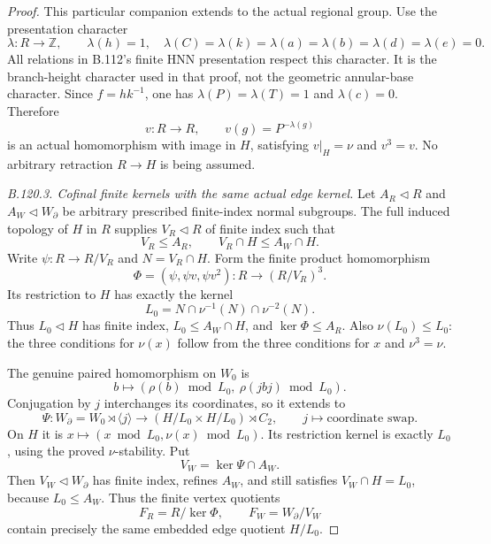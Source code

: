 \begin{proof}
This particular companion extends to the actual regional group.
Use the presentation character
\[
 \lambda:R\longrightarrow\mathbb Z,\qquad
 \lambda(h)=1,\quad
 \lambda(C)=\lambda(k)=\lambda(a)=\lambda(b)=\lambda(d)=\lambda(e)=0.
\]
All relations in B.112's finite HNN presentation respect this
character. It is the branch-height character used in that proof,
not the geometric annular-base character. Since $f=hk^{-1}$,
one has $\lambda(P)=\lambda(T)=1$ and $\lambda(c)=0$. Therefore
\begin{equation}\label{eq:B120-extension}
 v:R\longrightarrow R,\qquad v(g)=P^{-\lambda(g)}
\end{equation}
is an actual homomorphism with image in $H$, satisfying
$v|_H=\nu$ and $v^3=v$. No arbitrary retraction $R\to H$ is
being assumed.

\emph{B.120.3. Cofinal finite kernels with the same actual edge kernel.}
Let $A_R\lhd R$ and $A_W\lhd W_{\partial}$ be arbitrary prescribed
finite-index normal subgroups. The full induced topology of $H$
in $R$ supplies $V_R\lhd R$ of finite index such that
\[
 V_R\leq A_R,\qquad V_R\cap H\leq A_W\cap H.
\]
Write $\psi:R\to R/V_R$ and $N=V_R\cap H$. Form the finite
product homomorphism
\begin{equation}\label{eq:B120-triple-map}
 \Phi=(\psi,\psi v,\psi v^2):R\longrightarrow(R/V_R)^3.
\end{equation}
Its restriction to $H$ has exactly the kernel
\begin{equation}\label{eq:B120-edge-kernel}
 L_0=N\cap\nu^{-1}(N)\cap\nu^{-2}(N).
\end{equation}
Thus $L_0\lhd H$ has finite index, $L_0\leq A_W\cap H$, and
$\ker\Phi\leq A_R$. Also $\nu(L_0)\leq L_0$: the three
conditions for $\nu(x)$ follow from the three conditions for $x$
and $\nu^3=\nu$.

The genuine paired homomorphism on $W_0$ is
\[
 b\longmapsto
       (\rho(b)\bmod L_0,\ \rho(jbj)\bmod L_0).
\]
Conjugation by $j$ interchanges its coordinates, so it extends to
\begin{equation}\label{eq:B120-paired-map}
 \Psi:W_{\partial}=W_0\rtimes\langle j\rangle
       \longrightarrow (H/L_0\times H/L_0)\rtimes C_2,
 \qquad j\longmapsto\text{coordinate swap}.
\end{equation}
On $H$ it is $x\mapsto(x\bmod L_0,\nu(x)\bmod L_0)$.
Its restriction kernel is exactly $L_0$, using the proved
$\nu$-stability. Put
\[
 V_W=\ker\Psi\cap A_W.
\]
Then $V_W\lhd W_{\partial}$ has finite index, refines $A_W$,
and still satisfies $V_W\cap H=L_0$, because $L_0\leq A_W$.
Thus the finite vertex quotients
\[
 F_R=R/\ker\Phi,\qquad F_W=W_{\partial}/V_W
\]
contain precisely the same embedded edge quotient $H/L_0$.


\end{proof}
